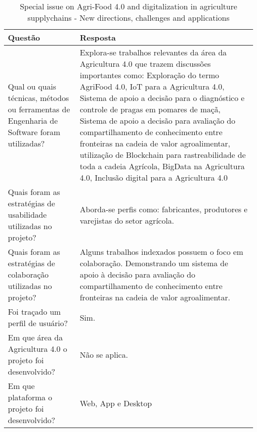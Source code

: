 \documentclass[12pt]{article}
\begin{document}
\begin{table}[!htb]
	\footnotesize
  \centering
	\begin{tabular}{|p{8cm}|p{6cm}|}
		\hline
		\textbf{Questão}                                                                           & \textbf{Resposta}                                                      \\ \hline
		Qual ou quais técnicas, métodos ou ferramentas de Engenharia de Software foram utilizadas? & Explora-se  trabalhos relevantes da área da Agricultura 4.0 que trazem discussões importantes como: Exploração do termo AgriFood 4.0, IoT para a Agricultura 4.0, Sistema de apoio a decisão para o diagnóstico e controle de pragas em pomares de maçã, Sistema de apoio a decisão para avaliação do compartilhamento de conhecimento entre fronteiras na cadeia de valor agroalimentar, utilização de Blockchain para rastreabilidade de toda a cadeia Agrícola, BigData na Agricultura 4.0, Inclusão digital para a Agricultura 4.0 \\ \hline
		Quais foram as estratégias de usabilidade utilizadas no projeto?                           & Aborda-se perfis como: fabricantes, produtores e varejistas do setor agrícola.                                 \\ \hline
		Quais foram as estratégias de colaboração utilizadas no projeto?                           & Alguns trabalhos indexados possuem o foco em colaboração. Demonstrando um sistema de apoio à decisão para avaliação do compartilhamento de conhecimento entre fronteiras na cadeia de valor agroalimentar.                                 \\ \hline
		Foi traçado um perfil de usuário?                                                          & Sim.                                                                \\ \hline
		Em que área da Agricultura 4.0 o projeto foi desenvolvido?                                 & Não se aplica.                                      \\ \hline
		Em que plataforma o projeto foi desenvolvido?                                              & Web, App e Desktop                                 \\ \hline
		\end{tabular}
  \caption{Special issue on Agri-Food 4.0 and digitalization in agriculture supplychains - New directions, challenges and applications}
  \label{tab:extracao2}
\end{table}
\end{document}
